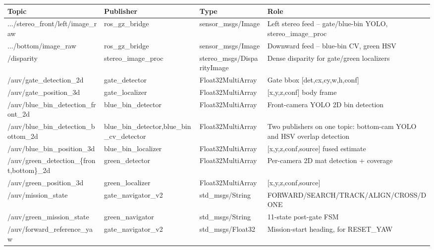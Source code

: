 \documentclass[10.5pt,a4paper]{article}
\begin{document}
\begin{table}[H]\centering\scriptsize
\begin{tabularx}{\textwidth}{L{4.6cm} L{2.6cm} L{3.1cm} X}
\toprule
{}\textbf{Topic} & \textbf{Publisher} & \textbf{Type} & \textbf{Role} \\
\midrule
\ttfamily .../stereo\_front/left/image\_raw & ros\_gz\_bridge & sensor\_msgs/Image & Left stereo feed -- gate/blue-bin YOLO, stereo\_image\_proc \\
\ttfamily .../bottom/image\_raw & ros\_gz\_bridge & sensor\_msgs/Image & Downward feed -- blue-bin CV, green HSV \\
\ttfamily /disparity & stereo\_image\_proc & stereo\_msgs/DisparityImage & Dense disparity for gate/green localizers \\
\ttfamily /auv/gate\_detection\_2d & gate\_detector & Float32MultiArray & Gate bbox [det,cx,cy,w,h,conf] \\
\ttfamily /auv/gate\_position\_3d & gate\_localizer & Float32MultiArray & [x,y,z,conf] body frame \\
\ttfamily /auv/blue\_bin\_detection\_\newline front\_2d & blue\_bin\_detector & Float32MultiArray & Front-camera YOLO 2D bin detection \\
\ttfamily /auv/blue\_bin\_detection\_\newline bottom\_2d & blue\_bin\_detector,\newline blue\_bin\_cv\_detector & Float32MultiArray & Two publishers on one topic: bottom-cam YOLO and HSV overlap detection \\
\ttfamily /auv/blue\_bin\_position\_3d & blue\_bin\_localizer & Float32MultiArray & [x,y,z,conf,source] fused estimate \\
\ttfamily /auv/green\_detection\_\newline \{front,bottom\}\_2d & green\_detector & Float32MultiArray & Per-camera 2D mat detection + coverage \\
\ttfamily /auv/green\_position\_3d & green\_localizer & Float32MultiArray & [x,y,z,conf,source] \\
\ttfamily /auv/mission\_state & gate\_navigator\_v2 & std\_msgs/String & FORWARD/SEARCH/TRACK/ALIGN/CROSS/DONE \\
\ttfamily /auv/green\_mission\_state & green\_navigator & std\_msgs/String & 11-state post-gate FSM \\
\ttfamily /auv/forward\_reference\_yaw & gate\_navigator\_v2 & std\_msgs/Float32 & Mission-start heading, for RESET\_YAW \\

\end{tabularx}
\end{table}
\end{document}
